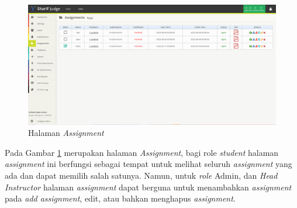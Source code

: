 \documentclass[a4paper,twoside]{article}
\begin{document}
\begin{enumerate}
\newpage
\begin{figure}[h!]
     \centering
     \includegraphics[width=0.8\linewidth]{Gambar/Assignment.png}
     \caption{Halaman \textit{Assignment}}
     \label{fig:Assignment}
 \end{figure}	
 Pada Gambar \ref{fig:Assignment} merupakan halaman \textit{Assignment}, bagi role \textit{student}  halaman \textit{assignment} ini berfungsi sebagai tempat untuk melihat seluruh \textit{assignment} yang ada dan dapat memilih salah satunya. Namun, untuk \textit{role} Admin, dan \textit{Head Instructor} halaman \textit{assignment} dapat berguna untuk menambahkan \textit{assignment} pada \textit{add assignment}, edit, atau bahkan menghapus \textit{assignment}. 
 

\end{enumerate}
\end{document}
